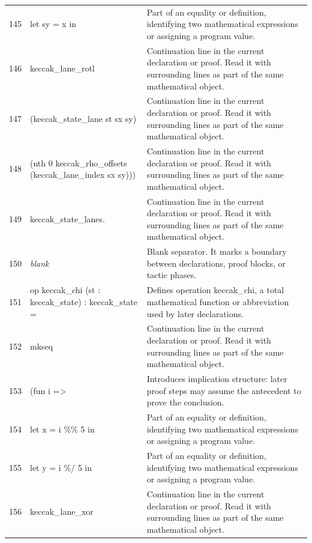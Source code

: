 \documentclass[10pt]{article}
\begin{document}
\begin{longtable}{r L{0.53\textwidth} L{0.37\textwidth}}
145 & {\ttfamily\scriptsize        let sy = x in} & Part of an equality or definition, identifying two mathematical expressions or assigning a program value. \\
146 & {\ttfamily\scriptsize        keccak\_lane\_rotl} & Continuation line in the current declaration or proof.  Read it with surrounding lines as part of the same mathematical object. \\
147 & {\ttfamily\scriptsize          (keccak\_state\_lane st sx sy)} & Continuation line in the current declaration or proof.  Read it with surrounding lines as part of the same mathematical object. \\
148 & {\ttfamily\scriptsize          (nth 0 keccak\_rho\_offsets (keccak\_lane\_index sx sy)))} & Continuation line in the current declaration or proof.  Read it with surrounding lines as part of the same mathematical object. \\
149 & {\ttfamily\scriptsize     keccak\_state\_lanes.} & Continuation line in the current declaration or proof.  Read it with surrounding lines as part of the same mathematical object. \\
150 & {\ttfamily\scriptsize \emph{blank}} & Blank separator.  It marks a boundary between declarations, proof blocks, or tactic phases. \\
151 & {\ttfamily\scriptsize op keccak\_chi (st : keccak\_state) : keccak\_state =} & Defines operation keccak\_chi, a total mathematical function or abbreviation used by later declarations. \\
152 & {\ttfamily\scriptsize   mkseq} & Continuation line in the current declaration or proof.  Read it with surrounding lines as part of the same mathematical object. \\
153 & {\ttfamily\scriptsize     (fun i =>} & Introduces implication structure: later proof steps may assume the antecedent to prove the conclusion. \\
154 & {\ttfamily\scriptsize        let x = i \%\% 5 in} & Part of an equality or definition, identifying two mathematical expressions or assigning a program value. \\
155 & {\ttfamily\scriptsize        let y = i \%/ 5 in} & Part of an equality or definition, identifying two mathematical expressions or assigning a program value. \\
156 & {\ttfamily\scriptsize        keccak\_lane\_xor} & Continuation line in the current declaration or proof.  Read it with surrounding lines as part of the same mathematical object. \\

\end{longtable}
\end{document}
